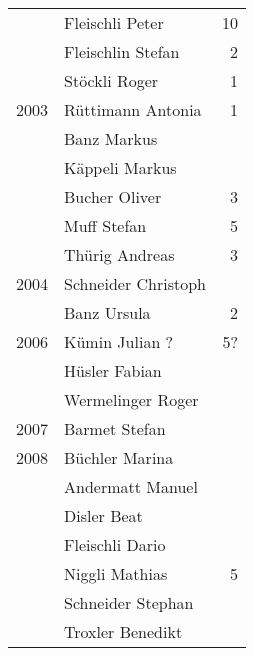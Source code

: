 {\begin{longtable}{ l l r }
                      & Fleischli Peter                           & 10          \\
                      & Fleischlin Stefan                         & 2           \\
                      & Stöckli Roger                             & 1           \\
        2003          & Rüttimann Antonia                         & 1           \\
                      & Banz Markus                               &             \\
                      & Käppeli Markus                            &             \\
                      & Bucher Oliver                             & 3           \\
                      & Muff Stefan                               & 5           \\
                      & Thürig Andreas                            & 3           \\
        2004          & Schneider Christoph                       &             \\
                      & Banz Ursula                               & 2           \\
        2006          & Kümin Julian ?                            & 5?          \\
                      & Hüsler Fabian                             &             \\
                      & Wermelinger Roger                         &             \\
        2007          & Barmet Stefan                             &             \\
        2008          & Büchler Marina                            &             \\
                      & Andermatt Manuel                          &             \\
                      & Disler Beat                               &             \\
                      & Fleischli Dario                           &             \\
                      & Niggli Mathias                            & 5           \\
                      & Schneider Stephan                         &             \\
                      & Troxler Benedikt                          &             \\

\end{longtable}}
